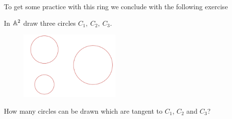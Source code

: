 To get some practice with this ring we conclude with the following exercise

\begin{exercise}
In $\mathbb{A}^2$ draw three circles $C_1,\ C_2,\ C_3$. 
\begin{figure}[!htb]
	\centering
	\includegraphics[width=5cm]{Images/Three-circles.png}
\end{figure}

How many circles can be drawn which are tangent to $C_1$, $C_2$ and $C_3$?
\end{exercise}
